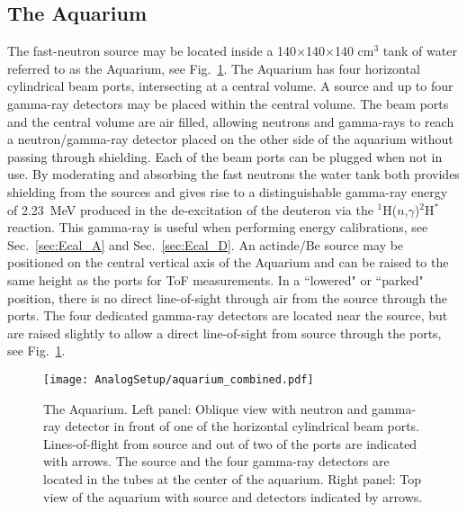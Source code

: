 \documentclass[main.tex]{subfiles}
\begin{document}
\subsection{The Aquarium}
The fast-neutron source may be located inside a 140$\times$140$\times$140 \si{\cm}${}^\text{3}$ tank of water referred to as the Aquarium, see Fig.~\ref{fig:aquarium}. The Aquarium has four horizontal cylindrical beam ports, intersecting at a central volume. A source and up to four gamma-ray detectors may be placed within the central volume.  The beam ports and the central volume are air filled, allowing neutrons and gamma-rays to reach a neutron/gamma-ray detector placed on the other side of the aquarium without passing through shielding. Each of the beam ports can be plugged when not in use.
By moderating and absorbing the fast neutrons the water tank both provides shielding from the sources and gives rise to a distinguishable gamma-ray energy of \SI{2.23}{MeV} produced in the de-excitation of the deuteron via the $^{\text{1}}$H($n$,$\gamma$)$^{\text{2}}$H$^*$ reaction. This gamma-ray is useful when performing energy calibrations, see Sec.~\ref{sec:Ecal_A} and Sec.~\ref{sec:Ecal_D}. 
An actinde/Be source may be positioned on the central vertical axis of the Aquarium and can be raised to the same height as the ports for ToF measurements. In a ``lowered" or ``parked" position, there is no direct line-of-sight through air from the source through the ports. The four dedicated gamma-ray detectors are located near the source, but are raised slightly to allow a direct line-of-sight from source through the ports, see Fig.~\ref{fig:aquarium}.
\begin{figure}[ht]
	\center
    	\texttt{[image: AnalogSetup/aquarium\_combined.pdf]}
	\caption[The Aquarium]{The Aquarium. Left panel: Oblique view with neutron and gamma-ray detector in front of one of the horizontal cylindrical beam ports. Lines-of-flight from source and out of two of the ports are indicated with arrows. The source and the four gamma-ray detectors are located in the tubes at the center of the aquarium. Right panel: Top view of the aquarium with source and detectors indicated by arrows.}
	\label{fig:aquarium}
\end{figure}
\end{document}
